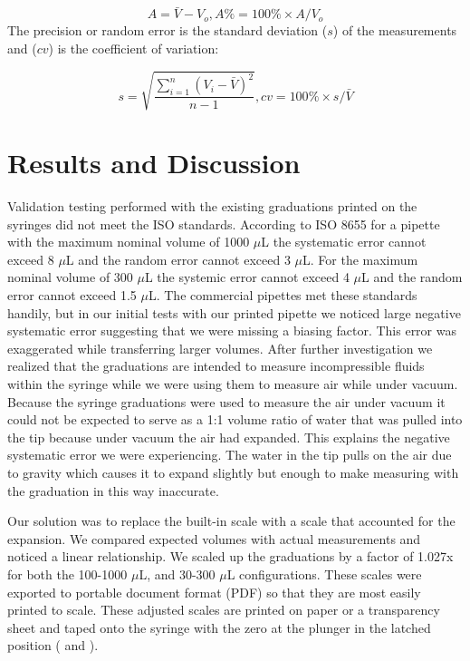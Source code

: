 \documentclass[10pt,letterpaper]{article}
\begin{document}
\begin{equation}\label{eq:accuracy} 
A = \bar{V}-V_{o},
A\% = 100\%  \times  A / V_{o}
\end{equation}
The precision or random error is the standard deviation ($s$) of the measurements and ($cv$) is the coefficient of variation:

\begin{equation}\label{eq:precision} 
s = \sqrt{\frac{\sum_{i=1}^{n}(V_{i}-\bar{V})^2}{n-1}},
cv = 100\% \times s / \bar{V}
\end{equation}

\section*{Results and Discussion}
Validation testing performed with the existing graduations printed on the syringes did not meet the ISO standards.
According to ISO 8655 for a pipette with the maximum nominal volume of 1000 $\mu$L the systematic error cannot exceed 8 $\mu$L and the random error cannot exceed 3 $\mu$L.
For the maximum nominal volume of 300 $\mu$L the systemic error cannot exceed 4 $\mu$L and the random error cannot exceed 1.5 $\mu$L.
The commercial pipettes met these standards handily, but in our initial tests with our printed pipette we noticed large negative systematic error suggesting that we were missing a biasing factor. 
This error was exaggerated while transferring larger volumes.
After further investigation we realized that the graduations are intended to measure incompressible fluids within the syringe while we were using them to measure air while under vacuum.
Because the syringe graduations were used to measure the air under vacuum it could not be expected to serve as a 1:1 volume ratio of water that was pulled into the tip because under vacuum the air had expanded.
This explains the negative systematic error we were experiencing.
The water in the tip pulls on the air due to gravity which causes it to expand slightly but enough to make measuring with the graduation in this way inaccurate.

Our solution was to replace the built-in scale with a scale that accounted for the expansion.
We compared expected volumes with actual measurements and noticed a linear relationship.
We scaled up the graduations by a factor of 1.027x for both the 100-1000 $\mu$L, and 30-300 $\mu$L configurations.
These scales were exported to portable document format (PDF) so that they are most easily printed to scale.
These adjusted scales are printed on paper or a transparency sheet and taped onto the syringe with the zero at the plunger in the latched position ( and ).
\end{document}
